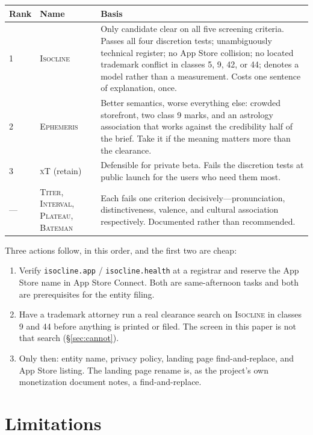 \documentclass[11pt,a4paper]{article}
\newcommand{\good}[1]{#1}
\newcommand{\code}[1]{\texttt{\small #1}}
\newcommand{\name}[1]{\textsc{#1}}
\begin{document}
\begin{longtable}{@{}L{1.0cm}L{2.8cm}L{11.3cm}@{}}
\toprule
\textbf{Rank} & \textbf{Name} & \textbf{Basis} \\
\midrule
{} & \good{\name{Isocline}} &
Only candidate clear on all five screening criteria. Passes all four
discretion tests; unambiguously technical register; no App Store
collision; no located trademark conflict in classes 5, 9, 42, or 44;
denotes a model rather than a measurement. Costs one sentence of
explanation, once. \\[0.4em]
2 & \name{Ephemeris} &
Better semantics, worse everything else: crowded storefront, two class
9 marks, and an astrology association that works against the
credibility half of the brief. Take it if the meaning matters more than
the clearance. \\[0.4em]
3 & \name{xT} (retain) &
Defensible for private beta. Fails the discretion tests at public
launch for the users who need them most. \\[0.4em]
--- & \name{Titer}, \name{Interval}, \name{Plateau}, \name{Bateman} &
Each fails one criterion decisively---pronunciation, distinctiveness,
valence, and cultural association respectively. Documented rather than
recommended. \\
\bottomrule
\end{longtable}

\noindent
Three actions follow, in this order, and the first two are cheap:

\begin{enumerate}[leftmargin=1.5em,itemsep=0.25em]
\item Verify \code{isocline.app} / \code{isocline.health} at a
      registrar and reserve the App Store name in App Store Connect.
      Both are same-afternoon tasks and both are prerequisites for the
      entity filing.
\item Have a trademark attorney run a real clearance search on
      \name{Isocline} in classes 9 and 44 before anything is printed or
      filed. The screen in this paper is not that search
      (\S\ref{sec:cannot}).
\item Only then: entity name, privacy policy, landing page
      find-and-replace, and App Store listing. The landing page rename
      is, as the project's own monetization document notes, a
      find-and-replace.
\end{enumerate}

\section{Limitations}
\label{sec:limitations}
\end{document}
